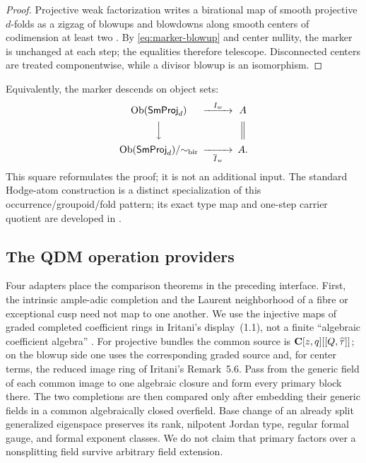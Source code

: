 \begin{proof}
Projective weak factorization writes a birational map of smooth projective
\(d\)-folds as a zigzag of blowups and blowdowns along smooth centers of
codimension at least two \cite[Theorem~0.3.1]{AKMW}.  By
\eqref{eq:marker-blowup} and center nullity, the marker is unchanged at each
step; the equalities therefore telescope.  Disconnected centers are treated
componentwise, while a divisor blowup is an isomorphism.
\end{proof}

Equivalently, the marker descends on object sets:
\begin{equation}
\begin{CD}
 \operatorname{Ob}(\mathsf{SmProj}_d) @>{I_w}>> A\\
 @VVV @|\\
 \operatorname{Ob}(\mathsf{SmProj}_d)/{\sim_{\mathrm{bir}}}
 @>>{\overline I_w}> A.
\end{CD}
\label{diag:marker-descent}
\end{equation}
This square reformulates the proof; it is not an additional input.
The standard Hodge-atom construction is a distinct specialization of this
occurrence/groupoid/fold pattern; its exact type map and one-step carrier
quotient are developed in \cite{RuddHodgeLedger}.

\subsection{The QDM operation providers}

Four adapters place the comparison theorems in the preceding interface.
First, the intrinsic ample-adic completion and the Laurent neighborhood of a
fibre or exceptional cusp need not map to one another.  We use the injective
maps of graded completed coefficient rings in Iritani's display~(1.1), not a
finite ``algebraic coefficient algebra'' \cite[(1.1)]{IritaniBlowup}.  For
projective bundles the common
source is \(\mathbf C[z,q][[Q,\widehat\tau]]\); on the blowup side one uses the
corresponding graded source and, for center terms, the reduced image ring of
Iritani's Remark~5.6.  Pass from the generic field of each common image to one
algebraic closure and form every primary block there.  The two completions are
then compared only after embedding their generic fields in a common
algebraically closed overfield.  Base change of an already split generalized
eigenspace preserves its rank, nilpotent Jordan type, regular formal gauge,
and formal exponent classes.  We do not claim that primary factors over a
nonsplitting field survive arbitrary field extension.

